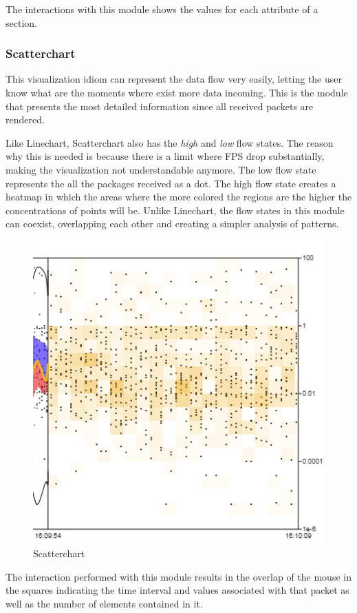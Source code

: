 \documentclass[letterpaper, 10 pt, conference]{ieeeconf}  %
\begin{document}
The interactions with this module shows the values for each attribute of a section.

\subsubsection{Scatterchart}
\label{subsubsection:scatterchart}
This visualization idiom can represent the data flow very easily, letting the user know what are the moments where exist more data incoming. This is the module that presents the most detailed information since all received packets are rendered. 

Like Linechart, Scatterchart also has the \textit{high} and \textit{low} flow states. The reason why this is needed is because there is a limit where FPS drop substantially, making the visualization not understandable anymore. The low flow state represents the all the packages received as a dot. The high flow state creates a heatmap in which the areas where the more colored the regions are the higher the concentrations of points will be. Unlike Linechart, the flow states in this module can coexist, overlapping each other and creating a simpler analysis of patterns.


\begin{figure}[ht]
    \centering
    \includegraphics[width=0.8\linewidth]{Figures/scatterchart.png}
    \caption{Scatterchart}
        \label{fig:scatterchart}
\end{figure}

The interaction performed with this module results in the overlap of the mouse in the squares indicating the time interval and values associated with that packet as well as the number of elements contained in it.
\end{document}
